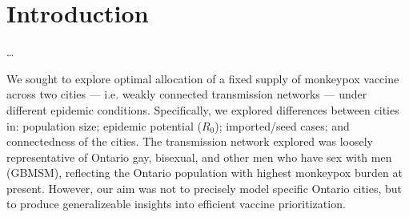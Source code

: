 \section{Introduction}
\dots
\par
We sought to explore optimal allocation of a fixed supply of monkeypox vaccine
across two cities --- i.e. weakly connected transmission networks ---
under different epidemic conditions.
Specifically, we explored differences between cities in:
population size; epidemic potential ($R_0$); imported/seed cases;
and connectedness of the cities.
The transmission network explored was loosely representative of
Ontario gay, bisexual, and other men who have sex with men (GBMSM),
reflecting the Ontario population with highest monkeypox burden at present.
However, our aim was not to precisely model specific Ontario cities,
but to produce generalizeable insights into efficient vaccine prioritization.

